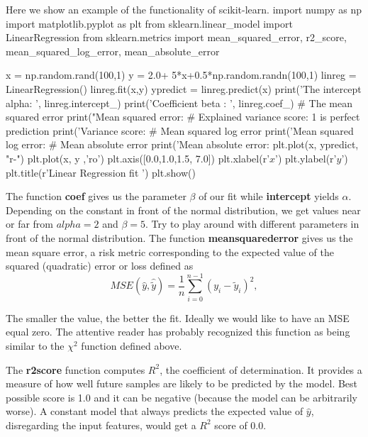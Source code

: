 \documentclass[%
oneside,                 %
final,                   %
10pt]{article}
\begin{document}
Here we show an
example of the functionality of scikit-learn.
\bpycod
import numpy as np 
import matplotlib.pyplot as plt 
from sklearn.linear_model import LinearRegression 
from sklearn.metrics import mean_squared_error, r2_score, mean_squared_log_error, mean_absolute_error

x = np.random.rand(100,1)
y = 2.0+ 5*x+0.5*np.random.randn(100,1)
linreg = LinearRegression()
linreg.fit(x,y)
ypredict = linreg.predict(x)
print('The intercept alpha: \n', linreg.intercept_)
print('Coefficient beta : \n', linreg.coef_)
# The mean squared error                               
print("Mean squared error: %
# Explained variance score: 1 is perfect prediction                                 
print('Variance score: %
# Mean squared log error                                                        
print('Mean squared log error: %
# Mean absolute error                                                           
print('Mean absolute error: %
plt.plot(x, ypredict, "r-")
plt.plot(x, y ,'ro')
plt.axis([0.0,1.0,1.5, 7.0])
plt.xlabel(r'$x$')
plt.ylabel(r'$y$')
plt.title(r'Linear Regression fit ')
plt.show()

\epycod
The function \textbf{coef} gives us the parameter $\beta$ of our fit while \textbf{intercept} yields 
$\alpha$. Depending on the constant in front of the normal distribution, we get values near or far from $alpha =2$ and $\beta =5$. Try to play around with different parameters in front of the normal distribution. The function \textbf{meansquarederror} gives us the mean square error, a risk metric corresponding to the expected value of the squared (quadratic) error or loss defined as
\[ MSE(\hat{y},\hat{\tilde{y}}) = \frac{1}{n}
\sum_{i=0}^{n-1}(y_i-\tilde{y}_i)^2, 
\] 

The smaller the value, the better the fit. Ideally we would like to
have an MSE equal zero.  The attentive reader has probably recognized
this function as being similar to the $\chi^2$ function defined above.

The \textbf{r2score} function computes $R^2$, the coefficient of
determination. It provides a measure of how well future samples are
likely to be predicted by the model. Best possible score is 1.0 and it
can be negative (because the model can be arbitrarily worse). A
constant model that always predicts the expected value of $\hat{y}$,
disregarding the input features, would get a $R^2$ score of $0.0$.
\end{document}
